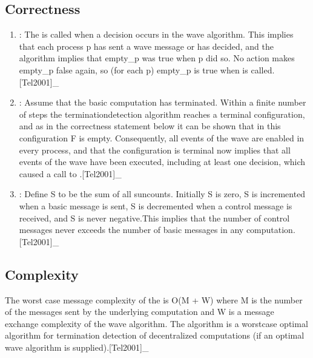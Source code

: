 \documentclass[letterpaper,10pt,english]{sphinxmanual}
\begin{document}
\subsection{Correctness}
\label{\detokenize{docs/ShavitFranchezAlg/algorithm:correctness}}\begin{enumerate}
%
\item {} 
\sphinxAtStartPar
{}: The  is called when a decision occurs in the wave algorithm. This implies that each process p has sent a wave message or has decided, and the algorithm implies that empty\_p was true when p did so. No action makes empty\_p false again, so (for each p) empty\_p is true when  is called.{[}Tel2001{]}\_

\item {} 
\sphinxAtStartPar
{}: Assume that the basic computation has terminated. Within a finite number of steps the termination\sphinxhyphen{}detection algorithm reaches a terminal configuration, and as in the correctness statement below it can be shown that in this configuration F is empty. Consequently, all events of the wave are enabled in every process, and that the configuration is terminal now implies that all events of the wave have been executed, including at least one decision, which caused a call to .{[}Tel2001{]}\_

\item {} 
\sphinxAtStartPar
{}: Define S to be the sum of all sun\sphinxhyphen{}counts. Initially S is zero, S is incremented when a basic message is sent, S is decremented when a control message is received, and S is never negative.This implies that the number of control messages never exceeds the number of basic messages in any computation.{[}Tel2001{]}\_

\end{enumerate}


\subsection{Complexity}
\label{\detokenize{docs/ShavitFranchezAlg/algorithm:complexity}}
\sphinxAtStartPar
The worst case message complexity of the {\hyperref[\detokenize{docs/ShavitFranchezAlg/algorithm:shavitfranchesterminationdetectionalgorithm}]{}} is O(M + W) where M is the number of the messages sent by the underlying computation and W is a message exchange complexity of the wave algorithm. The algorithm is a worst\sphinxhyphen{}case optimal algorithm for termination detection of decentralized computations (if an optimal wave algorithm is supplied).{[}Tel2001{]}\_
\end{document}

